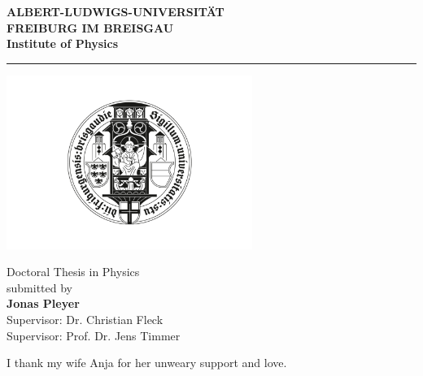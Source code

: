 \begin{titlepage}
\thispagestyle{empty}
\begin{center}
 
\Large\textbf{ALBERT-LUDWIGS-UNIVERSITÄT\\ FREIBURG IM BREISGAU\\}
\vspace{0.5cm}
\Large\textbf{Institute of Physics}

\rule{\textwidth}{1pt}
\vspace{1.5cm}

\Large\textbf{\Title}

\vspace{1.5cm}

\includegraphics[width=0.6\textwidth]{logos/uni-fr-sigil-black.png}

\vfill

\normalsize
Doctoral Thesis in Physics\\
\vspace{0.5cm}
submitted \Date\hspace{0pt} by\\
\vspace{0.5cm}
\Large\textbf{Jonas Pleyer}\\
\normalsize
\vspace{0.5cm}
\large Supervisor: Dr. Christian Fleck\\
\large Supervisor: Prof. Dr. Jens Timmer\\
\normalsize

\newpage
\thispagestyle{empty}
I thank my wife Anja for her unweary support and love.

\end{center}

\end{titlepage}
\thispagestyle{empty}

